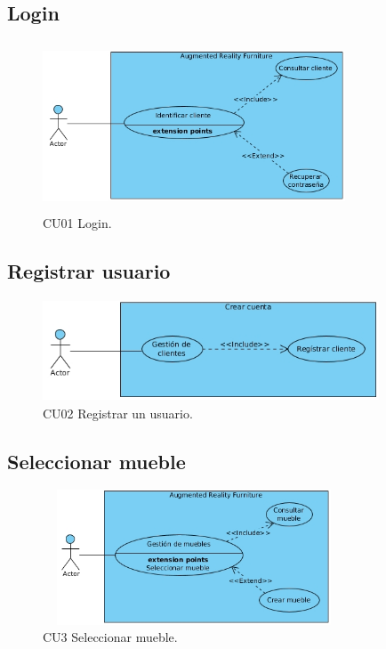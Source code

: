 \subsection{Login}
\begin{figure}[h!]
	\centering
	\includegraphics[width=9cm,height=5cm]{imagenes/analisis/login.jpg}
	\caption{CU01 Login.}
	\label{fig:analogo}
\end{figure}  

\subsection{Registrar usuario} 
\vspace{5mm} 	
\begin{figure}[h!]
	\centering
	\includegraphics[width=10cm,height=3cm]{imagenes/analisis/registro.jpg}
	\caption{CU02 Registrar un usuario.}
	\label{fig:analogo}
\end{figure} 
\newpage
\subsection{Seleccionar mueble} 
\vspace{5mm}
\begin{figure}[h!]
	\centering
	\includegraphics[width=9cm,height=4cm]{imagenes/analisis/seleccionarMueble.jpg}
	\caption{CU3 Seleccionar mueble.}
	\label{fig:analogo}
\end{figure}

